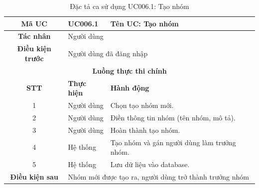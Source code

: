 \begin{table}[H]
    \centering
    \label{tab:uc006-1}
    \begin{tabularx}{\textwidth}{|c|p{3.5cm}|X|}
        \hline
        \rowcolor{headergreen} 
        \textbf{Mã UC} & \textbf{UC006.1} & \textbf{Tên UC: Tạo nhóm} \\ \hline
        \textbf{Tác nhân} & \multicolumn{2}{l|}{Người dùng} \\ \hline
        \textbf{Điều kiện trước} & \multicolumn{2}{X|}{Người dùng đã đăng nhập} \\ \hline
        
        \multicolumn{3}{|c|}{\cellcolor{headerorange}\textbf{Luồng thực thi chính}} \\ \hline
        \rowcolor{graybg} \textbf{STT} & \textbf{Thực hiện} & \textbf{Hành động} \\ \hline
        1 & Người dùng & Chọn tạo nhóm mới. \\ \hline
        2 & Người dùng & Điền thông tin nhóm (tên nhóm, mô tả). \\ \hline
        3 & Người dùng & Hoàn thành tạo nhóm. \\ \hline
        4 & Hệ thống & Tạo nhóm và gán người dùng làm trưởng nhóm. \\ \hline
        5 & Hệ thống & Lưu dữ liệu vào database. \\ \hline
        
        \textbf{Điều kiện sau} & \multicolumn{2}{X|}{Nhóm mới được tạo ra, người dùng trở thành trưởng nhóm} \\ \hline
    \end{tabularx}
    \caption{Đặc tả ca sử dụng UC006.1: Tạo nhóm}
\end{table}

